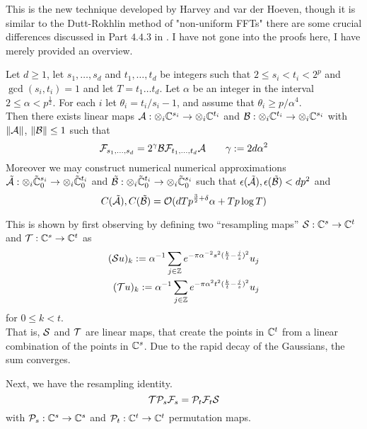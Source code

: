 This is the new technique developed by Harvey and var der Hoeven, though it is similar to the Dutt-Rokhlin method of "non-uniform FFTs" there are some crucial differences discussed in Part $4.4.3$ in \cite{nlogn}. I have not gone into the proofs here, I have merely provided an overview.

\begin{theorem}
    Let $d \geq 1$, let $s_1, \ldots, s_d$ and $t_1, \ldots, t_d$ be integers such that $2 \leq s_i < t_i < 2^p$ and $\gcd(s_i, t_i) = 1$ and let $T = t_1\ldots t_d$. Let $\alpha$ be an integer in the interval $2 \leq \alpha < p^{\frac{1}{2}}$. For each $i$ let $\theta_i = t_i / s_i - 1$, and assume that $\theta_i \geq p/\alpha^4$.\\
    Then there exists linear maps $\mathcal A: \otimes_i {\mathbb C}^{s_i} \to \otimes_i {\mathbb C}^{t_i}$ and $\mathcal B: \otimes_i {\mathbb C}^{t_i} \to \otimes_i {\mathbb C}^{s_i}$ with $\|\mathcal A\|$, $\|\mathcal B\| \leq 1$ such that
    \[
        \mathcal F_{s_1, \ldots, s_d} = 2^\gamma \mathcal B \mathcal F_{t_1, \ldots, t_d} \mathcal A \qquad \gamma := 2d\alpha^2
    \]
    Moreover we may construct numerical numerical approximations $\tilde{\mathcal A}: \otimes_i \tilde{{\mathbb C}}^{s_i}_0 \to \otimes_i \tilde{{\mathbb C}}^{t_i}_0$ and $\tilde{\mathcal B}: \otimes_i \tilde{{\mathbb C}}^{t_i}_0 \to \otimes_i \tilde{{\mathbb C}}^{s_i}_0$  such that $\epsilon(\tilde{\mathcal A}), \epsilon(\tilde{\mathcal B}) < dp^2$ and
    \[
        C(\tilde{\mathcal A}), C(\tilde{\mathcal B}) = \mathcal O(dTp^{{\frac{3}{2}} + \delta}\alpha + Tp\log T)
    \]
\end{theorem}

\medskip

This is shown by first observing by defining two ``resampling maps'' $\mathcal S: {\mathbb C}^s \to {\mathbb C}^t$ and $\mathcal T: {\mathbb C}^s \to {\mathbb C}^t$ as
\begin{align*}
    (\mathcal Su)_k := \alpha^{-1} \sum_{j \in {\mathbb Z}} e^{-\pi \alpha^{-2}s^2 (\frac{k}{t} - \frac{j}{s})^2}u_j\\
    (\mathcal Tu)_k := \alpha^{-1} \sum_{j \in {\mathbb Z}} e^{-\pi \alpha^2 t^2 (\frac{k}{t} - \frac{j}{s})^2}u_j
\end{align*}
for $0 \leq k < t$.\\
That is, $\mathcal S$ and $\mathcal T$ are linear maps, that create the points in ${\mathbb C}^t$ from a linear combination of the points in ${\mathbb C}^s$. Due to the rapid decay of the Gaussians, the sum converges.

Next, we have the resampling identity.
\[
    \mathcal T\mathcal P_s\mathcal F_s = \mathcal P_t\mathcal F_t\mathcal S
\]
with $\mathcal P_s: {\mathbb C}^s \to {\mathbb C}^s$ and $\mathcal P_t: {\mathbb C}^t \to {\mathbb C}^t$ permutation maps.

